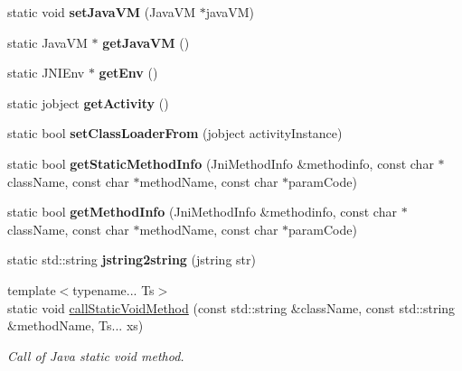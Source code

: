 \begin{DoxyCompactItemize}
\item 
\mbox{\label{classJniHelper_aec23852a7ceeffeb69cd2d7144481ca9}} 
static void {\bfseries set\+Java\+VM} (Java\+VM $\ast$java\+VM)
\item 
\mbox{\label{classJniHelper_ae8aa0c4df3a0b897bd755d58e7071387}} 
static Java\+VM $\ast$ {\bfseries get\+Java\+VM} ()
\item 
\mbox{\label{classJniHelper_a8a2b603f67bf8636bc14607a857ac695}} 
static J\+N\+I\+Env $\ast$ {\bfseries get\+Env} ()
\item 
\mbox{\label{classJniHelper_aaf2dcd411fdbc1fb5c42416af262ac2b}} 
static jobject {\bfseries get\+Activity} ()
\item 
\mbox{\label{classJniHelper_a9bd1327a373c0860da2cc5e20de24cf2}} 
static bool {\bfseries set\+Class\+Loader\+From} (jobject activity\+Instance)
\item 
\mbox{\label{classJniHelper_a188156a3c235f3555df597902425abbd}} 
static bool {\bfseries get\+Static\+Method\+Info} (Jni\+Method\+Info \&methodinfo, const char $\ast$class\+Name, const char $\ast$method\+Name, const char $\ast$param\+Code)
\item 
\mbox{\label{classJniHelper_ad173ee23161723497e7725ea1c956254}} 
static bool {\bfseries get\+Method\+Info} (Jni\+Method\+Info \&methodinfo, const char $\ast$class\+Name, const char $\ast$method\+Name, const char $\ast$param\+Code)
\item 
\mbox{\label{classJniHelper_ad608dc7493a1d48894c8c7a3f55096c7}} 
static std\+::string {\bfseries jstring2string} (jstring str)
\item 
\mbox{\label{classJniHelper_a150e8688e93959e9e7baec5ef231af93}} 
{\footnotesize template$<$typename... Ts$>$ }\\static void \hyperlink{classJniHelper_a150e8688e93959e9e7baec5ef231af93}{call\+Static\+Void\+Method} (const std\+::string \&class\+Name, const std\+::string \&method\+Name, Ts... xs)
\begin{DoxyCompactList}\small\item\em Call of Java static void method. \end{DoxyCompactList}\item 

\end{DoxyCompactItemize}
